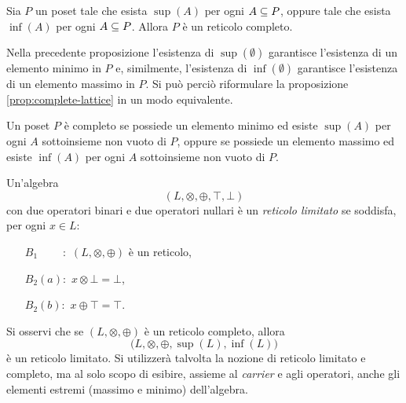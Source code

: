 \begin{proposizione}
\label{prop:complete-lattice0}
\textup{\cite{BurrisS81}}
Sia $P$ un poset tale che esista $\sup(A)$ per ogni $A \subseteq P$,
oppure tale che esista $\inf(A)$ per ogni $A \subseteq P$.
Allora $P$ \`e un reticolo completo.
\end{proposizione}

Nella precedente proposizione l'esistenza di $\sup(\emptyset)$ garantisce
l'esistenza di un elemento minimo in $P$ e, similmente, l'esistenza di
$\inf(\emptyset)$ garantisce l'esistenza di un elemento massimo in $P$.
Si pu\`o perci\`o riformulare la proposizione \ref{prop:complete-lattice} in un
modo equivalente.

\begin{proposizione}
\label{prop:complete-lattice}
{\rm \cite{BurrisS81}} Un poset $P$ \`e completo se possiede un elemento minimo
ed esiste $\sup(A)$ per ogni $A$ sottoinsieme non vuoto di $P$, oppure se
possiede un elemento massimo ed esiste $\inf(A)$ per ogni $A$ sottoinsieme non
vuoto di $P$.
\end{proposizione}

\begin{definizione}  
{\rm \cite{BurrisS81}} Un'algebra
\[
    (L, \otimes, \oplus, \top, \bot)
\]
con due operatori binari e due operatori nullari
\`e un \emph{reticolo limitato} se soddisfa, per ogni $x \in L$:
\begin{itemize}
\item[$B_1 \phantom{(a)}:$] $(L, \otimes, \oplus)$ \`e un reticolo,
\item[$B_2 (a):$] $x \otimes \bot = \bot$,
\item[$B_2 (b):$] $x \oplus  \top = \top$.
\end{itemize}
\end{definizione}
Si osservi che se $(L, \otimes, \oplus)$ \`e un reticolo completo, allora
\[
    \bigl(L, \otimes, \oplus, \sup(L), \inf(L)\bigr)
\]
\`e un reticolo limitato.
Si utilizzer\`a talvolta la nozione di reticolo limitato e
completo, ma al solo scopo di esibire, assieme al \emph{carrier} e agli
operatori, anche gli elementi estremi (massimo e minimo) dell'algebra.

